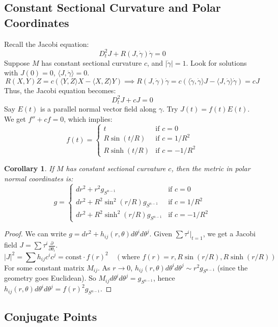\documentclass[11pt, a4paper]{article}
\theoremstyle{plain}
\newtheorem{corollary}[theorem]{Corollary}
\theoremstyle{definition}
\theoremstyle{remark}
\begin{document}
{    \subsection{Constant Sectional Curvature and Polar Coordinates}

Recall the Jacobi equation:
\[ D_t^2 J + R(J, \dot{\gamma})\dot{\gamma} = 0 \]
Suppose $M$ has constant sectional curvature $c$, and $|\dot{\gamma}| = 1$. Look for solutions with $J(0) = 0$, $\langle J, \dot{\gamma} \rangle = 0$.
\[ R(X,Y)Z = c(\langle Y,Z \rangle X - \langle X,Z \rangle Y) \implies R(J, \dot{\gamma})\dot{\gamma} = c(\langle \dot{\gamma},\dot{\gamma} \rangle J - \langle J,\dot{\gamma} \rangle \dot{\gamma}) = cJ \]
Thus, the Jacobi equation becomes:
\[ D_t^2 J + cJ = 0 \]
Say $E(t)$ is a parallel normal vector field along $\gamma$. Try $J(t) = f(t)E(t)$. We get $f'' + cf = 0$, which implies:
\[ f(t) = 
\begin{cases} 
t & \text{if } c = 0 \\
R \sin(t/R) & \text{if } c = 1/R^2 \\
R \sinh(t/R) & \text{if } c = -1/R^2 
\end{cases}
\]

\begin{corollary}
If $M$ has constant sectional curvature $c$, then the metric in polar normal coordinates is:
\[ g = 
\begin{cases} 
dr^2 + r^2 g_{S^{n-1}} & \text{if } c = 0 \\
dr^2 + R^2 \sin^2(r/R) g_{S^{n-1}} & \text{if } c = 1/R^2 \\
dr^2 + R^2 \sinh^2(r/R) g_{S^{n-1}} & \text{if } c = -1/R^2 
\end{cases}
\]
\end{corollary}

\begin{proof}
We can write $g = dr^2 + h_{ij}(r, \theta) d\theta^i d\theta^j$. Given $\sum \tau^i |_{t=1}$, we get a Jacobi field $J = \sum \tau^i \frac{\partial}{\partial \theta_i}$. 
\[ |J|^2 = \sum h_{ij} c^i c^j = \text{const} \cdot f(r)^2 \quad \left(\text{where } f(r) = r, R\sin(r/R), R\sinh(r/R)\right) \]
For some constant matrix $M_{ij}$.
As $r \to 0$, $h_{ij}(r, \theta) d\theta^i d\theta^j \sim r^2 g_{S^{n-1}}$ (since the geometry goes Euclidean).
So $M_{ij} d\theta^i d\theta^j = g_{S^{n-1}}$, hence $h_{ij}(r, \theta) d\theta^i d\theta^j = f(r)^2 g_{S^{n-1}}$.
\end{proof}

\subsection{Conjugate Points}

}
\end{document}
